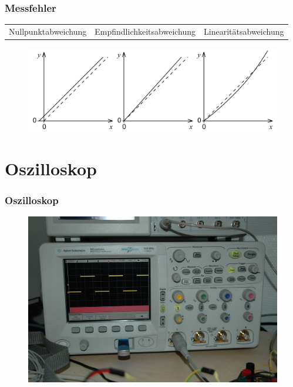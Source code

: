 \begin{frame}
  \frametitle{Messfehler}
  \begin{center}
    \begin{tabular}{ccc}
      Nullpunktabweichung & Empfindlichkeitsabweichung & Linearitätsabweichung
    \end{tabular}
    \begin{figure}
      \includegraphics[width=1\textwidth,height=.6\textheight]{a16/werMisstMisst.png}
    \end{figure}
  \end{center}
\end{frame}

\section*{Oszilloskop}


\begin{frame}
  \frametitle{Oszilloskop}
  \begin{center}
    \begin{figure}
      \includegraphics[width=1\textwidth,height=.7\textheight,keepaspectratio]{a16/osziModern.jpg}
    \end{figure}
  \end{center}
\end{frame}

